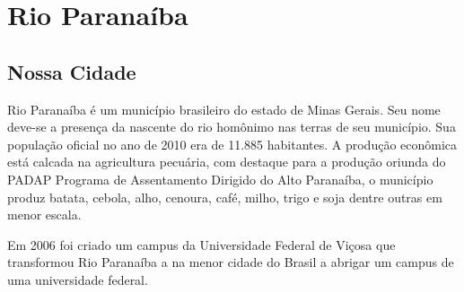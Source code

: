 \documentclass[
	12pt,				    %
	openright,			    %
	oneside,			    %
	a4paper,			    %
    sumario=tradicional,    %
	english,			    %
	brazil,				    %
	]{abntex2}              %
\begin{document}
\listoffigures*
\cleardoublepage

\listoftables*
\cleardoublepage







\tableofcontents*
\cleardoublepage



\textual

\chapter{Rio Paranaíba}
\section{Nossa Cidade}

Rio Paranaíba é um município brasileiro do estado de Minas Gerais. Seu nome deve-se a presença da nascente do rio homônimo nas terras de seu município. Sua população oficial no ano de 2010 era de 11.885 habitantes. A produção econômica está calcada na agricultura pecuária, com destaque para a produção oriunda do PADAP Programa de Assentamento Dirigido do Alto Paranaíba, o município produz batata, cebola, alho, cenoura, café, milho, trigo e soja dentre outras em menor escala.

Em 2006 foi criado um campus da Universidade Federal de Viçosa que transformou Rio Paranaíba a na menor cidade do Brasil a abrigar um campus de uma universidade federal.
\end{document}
